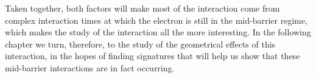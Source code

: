 Taken together, both factors will make most of the interaction come from complex interaction times at which the electron is still in the mid-barrier regime, which makes the study of the interaction all the more interesting. In the following chapter we turn, therefore, to the study of the geometrical effects of this interaction, in the hopes of finding signatures that will help us show that these mid-barrier interactions are in fact occurring.































